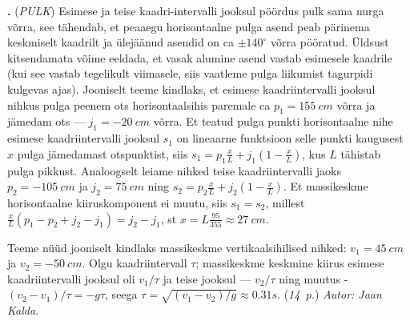 \documentclass[12pt,a5paper]{article}
\newcommand{\numb}[1]{\vspace{5pt}\textbf{\large #1}}
\newcommand{\nimi}[1]{(\textsl{\small #1})}
\newcommand{\punktid}[1]{(\emph{#1~p.})}
\newcommand{\autor}[1]{\emph{ Autor: #1.}}
\newcounter{ylesanne}
\newcommand{\yl}[1]{\addtocounter{ylesanne}{1}\numb{\theylesanne.} \nimi{#1} \newblock{}}
\begin{document}
\yl{PULK}
Esimese ja teise kaadri-intervalli jooksul pöördus pulk sama nurga võrra, see tähendab, et peaaegu horisontaalne pulga asend peab pärinema keskmiselt kaadrilt ja ülejäänud asendid on ca $\pm 140^\circ$ võrra pööratud. Üldsust kitsendamata võime eeldada, et vasak alumine asend vastab esimesele kaadrile (kui see vastab tegelikult viimasele, siis vaatleme pulga liikumist tagurpidi kulgevas ajas). Jooniselt teeme kindlaks, et esimese kaadriintervalli jooksul nihkus pulga peenem ots horisontaalsihis paremale ca $p_1=\SI{155}{cm}$ võrra ja jämedam ots --- $j_1=\SI{-20}{cm}$  võrra. Et teatud pulga punkti horisontaalne nihe esimese kaadriintervalli jooksul $s_1$ on lineaarne funktsioon selle punkti kaugusest $x$ pulga jämedamast otspunktist, siis $s_1=p_1\frac xL+j_1(1-\frac xL)$, kus $L$ tähistab pulga pikkust. Analoogselt leiame nihked teise kaadriintervalli jaoks $p_2=\SI{-105}{cm}$ ja $j_2=\SI{75}{cm}$ ning $s_2=p_2\frac xL+j_2(1-\frac xL)$. Et massikeskme horisontaalne kiiruskomponent ei muutu, siis $s_1=s_2$, millest $\frac xL(p_1-p_2+j_2-j_1)=j_2-j_1$, st $x=L\frac{95}{355}\approx \SI{27}{cm}$.

Teeme nüüd jooniselt kindlaks massikeskme vertikaalsihilised nihked: $v_1=\SI{45}{cm}$ ja $v_2=\SI{-50}{cm}$.
Olgu kaadriintervall $\tau$; massikeskme keskmine kiirus esimese kaadriintervalli jooksul oli $v_1/\tau$ ja teise jooksul --- $v_2/\tau$ ning muutus - $(v_2-v_1)/\tau= -g\tau$, seega $\tau=\sqrt{(v_1-v_2)/g}\approx \SI{0.31}s$.
\punktid{14}\autor{Jaan Kalda}
\end{document}
